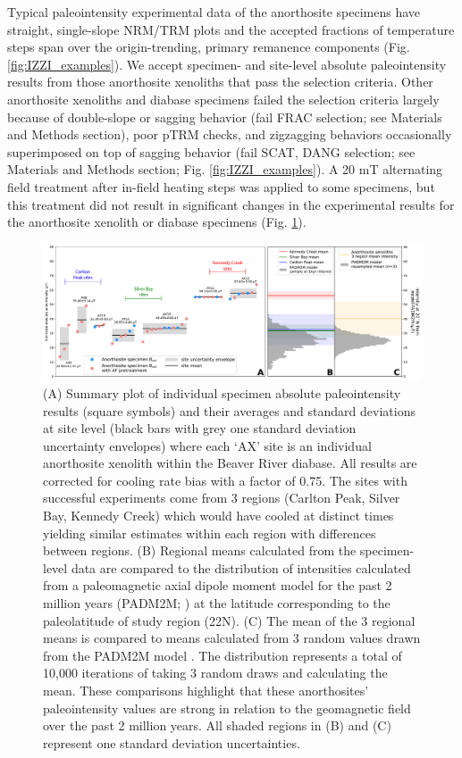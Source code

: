 Typical paleointensity experimental data of the anorthosite specimens have straight, single-slope NRM/TRM plots and the accepted fractions of temperature steps span over the origin-trending, primary remanence components (Fig. \ref{fig:IZZI_examples}). We accept specimen- and site-level absolute paleointensity results from those anorthosite xenoliths that pass the selection criteria. Other anorthosite xenoliths and diabase specimens failed the selection criteria largely because of double-slope or sagging behavior (fail FRAC selection; see Materials and Methods section), poor pTRM checks, and zigzagging behaviors occasionally superimposed on top of sagging behavior (fail SCAT, DANG selection; see Materials and Methods section; Fig. \ref{fig:IZZI_examples}). A 20 mT alternating field treatment after in-field heating steps was applied to some specimens, but this treatment did not result in significant changes in the experimental results for the anorthosite xenolith or diabase specimens (Fig. \ref{fig:PINT_cooling_corrected}). 

\begin{figure}[h!]
\noindent\includegraphics[width=\textwidth]{figure/Zhang2022/Paleointensity_plot_cooling_corrected.pdf}
\centering
\caption[Paleointensity results]{\footnotesize{(A) Summary plot of individual specimen absolute paleointensity results (square symbols) and their averages and standard deviations at site level (black bars with grey one standard deviation uncertainty envelopes) where each `AX' site is an individual anorthosite xenolith within the Beaver River diabase. All results are corrected for cooling rate bias with a factor of 0.75. The sites with successful experiments come from 3 regions (Carlton Peak, Silver Bay, Kennedy Creek) which would have cooled at distinct times yielding similar estimates within each region with differences between regions. (B) Regional means calculated from the specimen-level data are compared to the distribution of intensities calculated from a paleomagnetic axial dipole moment model for the past 2 million years (PADM2M; \citealp{Ziegler2011a}) at the latitude corresponding to the paleolatitude of study region (22\textdegree N). (C) The mean of the 3 regional means is compared to means calculated from 3 random values drawn from the PADM2M model \citep{Ziegler2011a}. The distribution represents a total of 10,000 iterations of taking 3 random draws and calculating the mean. These comparisons highlight that these anorthosites' paleointensity values are strong in relation to the geomagnetic field over the past 2 million years. All shaded regions in (B) and (C) represent one standard deviation uncertainties.}}
\label{fig:PINT_cooling_corrected}
\end{figure}

